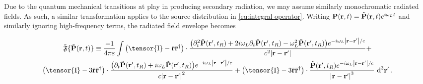 Due to the quantum mechanical transitions at play in producing secondary radiation, we may assume similarly monochromatic radiated fields.
As such, a similar transformation applies to the source distribution in \cref{eq:integral operator}.
Writing $\vb{P}(\vb{r}, t) = \tilde{\vb{P}}(\vb{r}, t)e^{i \omega_L t}$ and similarly ignoring high-frequency terms, the radiated field envelope becomes
\begin{widetext}
\begin{equation}
  \begin{gathered}
    \tilde{\mathfrak{F}}\{ \tilde{\vb{P}}(\vb{r}, t) \} \equiv \frac{-1}{4\pi \varepsilon} \int
    \qty(\tensor{\mathrm{I}} -  \bar{\vb{r}}\bar{\vb{r}}^\dagger) \cdot \frac{\qty(\partial_t^2 \tilde{\vb{P}}(\vb{r}', t_R) + 2 i \omega_L \partial_t \tilde{\vb{P}}(\vb{r}', t_R) - \omega_L^2 \tilde{\vb{P}}(\vb{r}', t_R)) e^{-i \omega_L \abs{\vb{r} - \vb{r}'}/c}}{c^2 \abs{\vb{r}-\vb{r}'}} + \\
    \qty(\tensor{\mathrm{I}} - 3\bar{\vb{r}}\bar{\vb{r}}^\dagger) \cdot \frac{\qty(\partial_t \tilde{\vb{P}}(\vb{r}', t_R) + i \omega_L \tilde{\vb{P}}(\vb{r}', t_R))e^{-i \omega_L \abs{\vb{r} - \vb{r}'}/c}}{c \abs{\vb{r}-\vb{r}'}^2} +
    \qty(\tensor{\mathrm{I}} - 3\bar{\vb{r}}\bar{\vb{r}}^\dagger) \cdot \frac{                \tilde{\vb{P}}(\vb{r}', t_R) e^{-i \omega_L \abs{\vb{r} - \vb{r}'}/c}}{\abs{\vb{r}-\vb{r}'}^3}
    \, \dd[3]{\vb{r'}}.
  \end{gathered}
  \label{eq:radiated envelope}
\end{equation}
\end{widetext}



